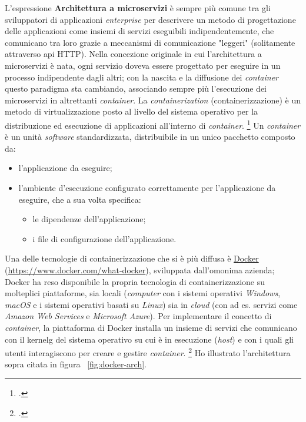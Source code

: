 L'espressione \textbf{Architettura a microservizi} è sempre più comune tra gli sviluppatori di applicazioni \textit{enterprise} per descrivere un metodo di progettazione delle applicazioni come insiemi di servizi eseguibili indipendentemente, che comunicano tra loro grazie a meccanismi di comunicazione "leggeri" (solitamente attraverso \gls{api} HTTP).
Nella concezione originale in cui l'architettura a microservizi è nata, ogni servizio doveva essere progettato per eseguire in un processo indipendente dagli altri; con la nascita e la diffusione dei \emph{container} questo paradigma sta cambiando, associando sempre più l'esecuzione dei microservizi in altrettanti \emph{container}.
La \emph{containerization} (containerizzazione) è un metodo di virtualizzazione posto al livello del sistema operativo per la distribuzione ed esecuzione di applicazioni all'interno di \emph{container}.
\footcite{site:containerization}
Un \emph{container} è un unità \emph{software} standardizzata, distribuibile in un unico pacchetto composto da:
\begin{itemize}
  \itemsep0em
  \item l'applicazione da eseguire;
  \item l'ambiente d'esecuzione configurato correttamente per l'applicazione da eseguire, che a sua volta specifica:
  \begin{itemize}
    \item le dipendenze dell'applicazione;
    \item i file di configurazione dell'applicazione.
  \end{itemize}
\end{itemize}
Una delle tecnologie di containerizzazione che si è più diffusa è \href{https://www.docker.com/what-docker}{Docker} (\url{https://www.docker.com/what-docker}), sviluppata dall'omonima azienda; Docker ha reso disponibile la propria tecnologia di containerizzazione su molteplici piattaforme, sia locali (\emph{computer} con i sistemi operativi \emph{Windows}, \emph{macOS} e i sistemi operativi basati su \emph{Linux}) sia in \emph{cloud} (con ad es. servizi come \emph{Amazon Web Services} e \emph{Microsoft Azure}).
Per implementare il concetto di \emph{container}, la piattaforma di Docker installa un insieme di servizi che comunicano con il \gls{kernelg} del sistema operativo su cui è in esecuzione (\emph{host}) e con i quali gli utenti interagiscono per creare e gestire \emph{container}.
\footcite{site:docker-container}
Ho illustrato l'architettura sopra citata in figura ~\ref{fig:docker-arch}.

